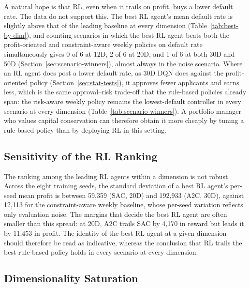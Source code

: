 \documentclass[preprint,review,authoryear,12pt]{elsarticle}
\begin{document}
A natural hope is that RL, even when it trails on profit, buys a lower default rate. The
data do not support this. The best RL agent's mean default rate is slightly above that of
the leading baseline at every dimension (Table~\ref{tab:best-by-dim}), and counting
scenarios in which the best RL agent beats both the profit-oriented and constraint-aware
weekly policies on default rate simultaneously gives 0 of 6 at 12D, 2 of 6 at 20D, and 1
of 6 at both 30D and 50D (Section~\ref{sec:scenario-winners}), almost always in the noise
scenario. Where an RL agent does post a lower default rate, as 30D DQN does against the
profit-oriented policy (Section~\ref{sec:stat-tests}), it approves fewer applicants and
earns less, which is the same approval--risk trade-off that the rule-based policies
already span: the risk-aware weekly policy remains the lowest-default controller in every
scenario at every dimension (Table~\ref{tab:scenario-winners}). A portfolio manager who
values capital conservation can therefore obtain it more cheaply by tuning a rule-based
policy than by deploying RL in this setting.

\subsection{Sensitivity of the RL Ranking}
\label{sec:rl-sensitivity}

The ranking among the leading RL agents within a dimension is not robust. Across the
eight training seeds, the standard deviation of a best RL agent's per-seed mean profit is
between 59{,}359 (SAC, 20D) and 192{,}933 (A2C, 30D), against 12{,}113 for the
constraint-aware weekly baseline, whose per-seed variation reflects only evaluation
noise. The margins that decide the best RL agent are often smaller than this spread: at
20D, A2C trails SAC by 4{,}170 in reward but leads it by 11{,}453 in profit. The
identity of the best RL agent at a given dimension should therefore be read as
indicative, whereas the conclusion that RL trails the best rule-based policy holds in
every scenario at every dimension.

\subsection{Dimensionality Saturation}
\end{document}
